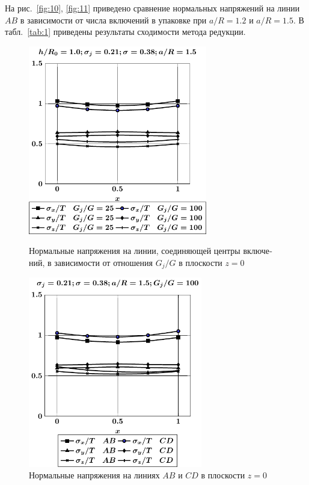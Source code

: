 \begin{russian}
На рис.~\ref{fig:10}, \ref{fig:11} приведено сравнение нормальных напряжений на линии $AB$ в зависимости от числа включений в упаковке при $a/R=1.2$ и $a/R=1.5$. В табл.~\ref{tab:1} приведены результаты сходимости метода редукции.

\begin{figure}[h!]
\centering\footnotesize
\parbox[b]{7.5cm}{\centering\includegraphics[width=7.8cm]{inc16-g-h10-r10-z0.pdf}
\caption{Нормальные напряжения на линии, соединяющей центры включений, в зависимости от отношения $G_j/G$ в плоскости $z=0$
\label{fig:8}}}\hfil\hfil
\parbox[b]{7.5cm}{\centering\includegraphics[width=7.6cm]{inc16-(ab-cd)-h10-r10-g100-z0.pdf}
\caption{Нормальные напряжения на линиях $AB$ и $CD$ в плоскости $z=0$
\label{fig:9}
}}
\end{figure}


\end{russian}
